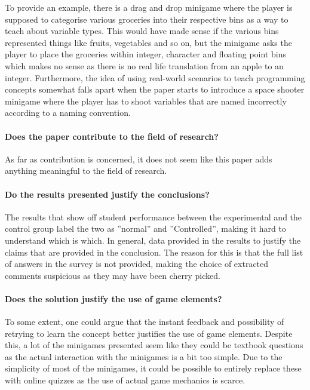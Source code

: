 To provide an example, there is a drag and drop minigame where the player is supposed to categorise various groceries into their respective bins as a way to teach about variable types. This would have made sense if the various bins represented things like fruits, vegetables and so on, but the minigame asks the player to place the groceries within integer, character and floating point bins which makes no sense as there is no real life translation from an apple to an integer. 
Furthermore, the idea of using real-world scenarios to teach programming concepts somewhat falls apart when the paper starts to introduce a space shooter minigame where the player has to shoot variables that are named incorrectly according to a naming convention.  

\paragraph{Does the paper contribute to the field of research?}
As far as contribution is concerned, it does not seem like this paper adds anything meaningful to the field of research. 

\paragraph{Do the results presented justify the conclusions?} 
The results that show off student performance between the experimental and the control group label the two as ''normal'' and ''Controlled'', making it hard to understand which is which. In general, data provided in the results to justify the claims that are provided in the conclusion. The reason for this is that the full list of answers in the survey is not provided, making the choice of extracted comments suspicious as they may have been cherry picked. 

\paragraph{Does the solution justify the use of game elements?}
To some extent, one could argue that the instant feedback and possibility of retrying to learn the concept better justifies the use of game elements. Despite this, a lot of the minigames presented seem like they could be textbook questions as the actual interaction with the minigames is a bit too simple. Due to the simplicity of most of the minigames, it could be possible to entirely replace these with online quizzes as the use of actual game mechanics is scarce. 


